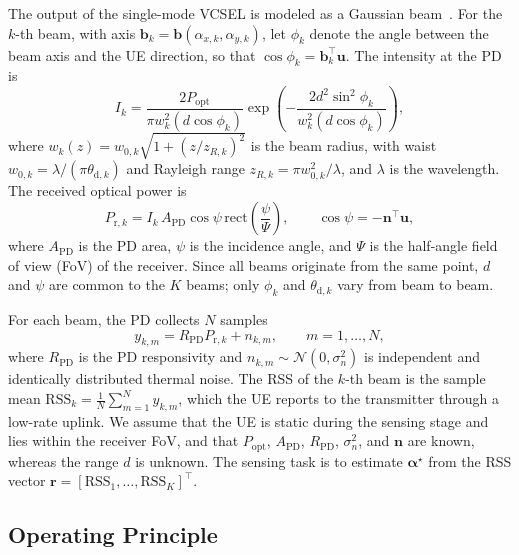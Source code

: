 \documentclass[journal]{IEEEtran}
\begin{document}
The output of the single-mode VCSEL is modeled as a Gaussian
beam~\cite{Saleh2019}. For the $k$-th beam, with axis
$\mathbf{b}_k=\mathbf{b}(\alpha_{x,k},\alpha_{y,k})$, let $\phi_k$ denote
the angle between the beam axis and the UE direction, so that
$\cos\phi_k=\mathbf{b}_k^{\top}\mathbf{u}$. The intensity at the PD is
\begin{equation}
  I_k=\frac{2P_{\mathrm{opt}}}{\pi w_k^{2}(d\cos\phi_k)}
  \exp\!\left(-\frac{2d^{2}\sin^{2}\phi_k}{w_k^{2}(d\cos\phi_k)}\right),
  \label{eq:intensity}
\end{equation}
where $w_k(z)=w_{0,k}\sqrt{1+(z/z_{R,k})^{2}}$ is the beam radius, with
waist $w_{0,k}=\lambda/(\pi\theta_{\mathrm{d},k})$ and Rayleigh range
$z_{R,k}=\pi w_{0,k}^{2}/\lambda$, and $\lambda$ is the wavelength. The
received optical power is
\begin{equation}
  P_{\mathrm{r},k}=I_k\,A_{\mathrm{PD}}\cos\psi\,
  \mathrm{rect}\!\left(\frac{\psi}{\Psi}\right),
  \qquad \cos\psi=-\mathbf{n}^{\top}\mathbf{u},
  \label{eq:received_power}
\end{equation}
where $A_{\mathrm{PD}}$ is the PD area, $\psi$ is the incidence angle, and
$\Psi$ is the half-angle field of view (FoV) of the receiver. Since all
beams originate from the same point, $d$ and $\psi$ are common to the $K$
beams; only $\phi_k$ and $\theta_{\mathrm{d},k}$ vary from beam to beam.

For each beam, the PD collects $N$ samples
\begin{equation}
  y_{k,m}=R_{\mathrm{PD}}P_{\mathrm{r},k}+n_{k,m},
  \qquad m=1,\dots,N,
  \label{eq:samples}
\end{equation}
where $R_{\mathrm{PD}}$ is the PD responsivity and
$n_{k,m}\sim\mathcal{N}(0,\sigma_n^{2})$ is independent and identically
distributed thermal noise. The RSS of the $k$-th beam is the sample mean
$\mathrm{RSS}_k=\frac{1}{N}\sum_{m=1}^{N}y_{k,m}$, which the UE reports to
the transmitter through a low-rate uplink. We assume that the UE is
static during the sensing stage and lies within the receiver FoV, and
that $P_{\mathrm{opt}}$, $A_{\mathrm{PD}}$, $R_{\mathrm{PD}}$,
$\sigma_n^{2}$, and $\mathbf{n}$ are known, whereas the range $d$ is
unknown. The sensing task is to estimate $\boldsymbol{\alpha}^{\star}$
from the RSS vector
$\mathbf{r}=[\mathrm{RSS}_1,\dots,\mathrm{RSS}_K]^{\top}$.

\subsection{Operating Principle}
\end{document}
